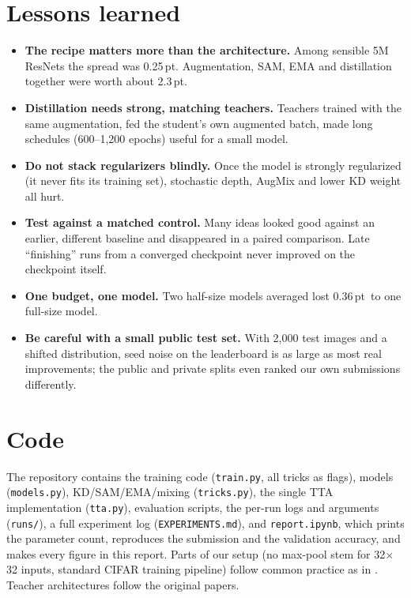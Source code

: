 \documentclass[10pt]{article}
\newcommand{\pt}{\,pt}
\begin{document}
\section{Lessons learned}
\begin{itemize}
\item \textbf{The recipe matters more than the architecture.} Among sensible 5M ResNets the spread was 0.25\pt.
  Augmentation, SAM, EMA and distillation together were worth about 2.3\pt.
\item \textbf{Distillation needs strong, matching teachers.} Teachers trained with the same augmentation, fed the student's own
  augmented batch, made long schedules (600--1,200 epochs) useful for a small model.
\item \textbf{Do not stack regularizers blindly.} Once the model is strongly regularized (it never fits its training set),
  stochastic depth, AugMix and lower KD weight all hurt.
\item \textbf{Test against a matched control.} Many ideas looked good against an earlier, different baseline and disappeared in a paired comparison.
  Late ``finishing'' runs from a converged checkpoint never improved on the checkpoint itself.
\item \textbf{One budget, one model.} Two half-size models averaged lost 0.36\pt\ to one full-size model.
\item \textbf{Be careful with a small public test set.} With 2,000 test images and a shifted distribution, seed noise on the
  leaderboard is as large as most real improvements; the public and private splits even ranked our own submissions differently.
\end{itemize}

\section*{Code}
The repository contains the training code (\texttt{train.py}, all tricks as flags), models (\texttt{models.py}), KD/SAM/EMA/mixing
(\texttt{tricks.py}), the single TTA implementation (\texttt{tta.py}), evaluation scripts, the per-run logs and arguments
(\texttt{runs/}), a full experiment log (\texttt{EXPERIMENTS.md}), and \texttt{report.ipynb}, which prints the parameter count,
reproduces the submission and the validation accuracy, and makes every figure in this report.
Parts of our setup (no max-pool stem for 32$\times$32 inputs, standard CIFAR training pipeline) follow common practice as in
\cite{kuangliu}. Teacher architectures follow the original papers.
\end{document}
